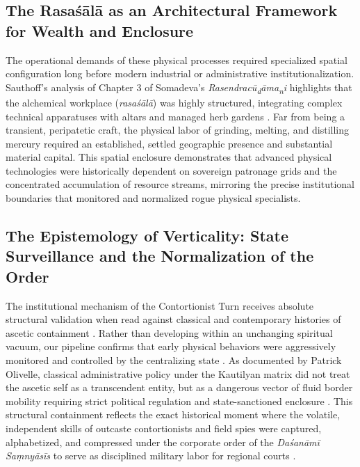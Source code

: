\documentclass[11pt,twoside,letterpaper]{article}
\begin{document}
\subsection{The Rasa\'s\={a}l\={a} as an Architectural Framework for Wealth and Enclosure}
The operational demands of these physical processes required specialized spatial configuration long before modern industrial or administrative institutionalization. Sauthoff’s analysis of Chapter 3 of Somadeva’s \textit{Rasendrac\={u}\textsubscript{d}\={a}ma\textsubscript{n}i} highlights that the alchemical workplace (\textit{rasa\'s\={a}l\={a}}) was highly structured, integrating complex technical apparatuses with altars and managed herb gardens \cite{Wujastyk2025}. Far from being a transient, peripatetic craft, the physical labor of grinding, melting, and distilling mercury required an established, settled geographic presence and substantial material capital. This spatial enclosure demonstrates that advanced physical technologies were historically dependent on sovereign patronage grids and the concentrated accumulation of resource streams, mirroring the precise institutional boundaries that monitored and normalized rogue physical specialists.


\subsection{The Epistemology of Verticality: State Surveillance and the Normalization of the Order}

The institutional mechanism of the Contortionist Turn receives absolute structural validation when read against classical and contemporary histories of ascetic containment \cite{Clark2006, Olivelle1987}. Rather than developing within an unchanging spiritual vacuum, our pipeline confirms that early physical behaviors were aggressively monitored and controlled by the centralizing state \cite{Olivelle1987, Olivelle2011}. As documented by Patrick Olivelle, classical administrative policy under the Kautilyan matrix did not treat the ascetic self as a transcendent entity, but as a dangerous vector of fluid border mobility requiring strict political regulation and state-sanctioned enclosure \cite{Olivelle1987, Olivelle2011}. This structural containment reflects the exact historical moment where the volatile, independent skills of outcaste contortionists and field spies were captured, alphabetized, and compressed under the corporate order of the \textit{Daśanāmī Saṃnyāsīs} to serve as disciplined military labor for regional courts \cite{Clark2006, Clark2018}.
\end{document}
